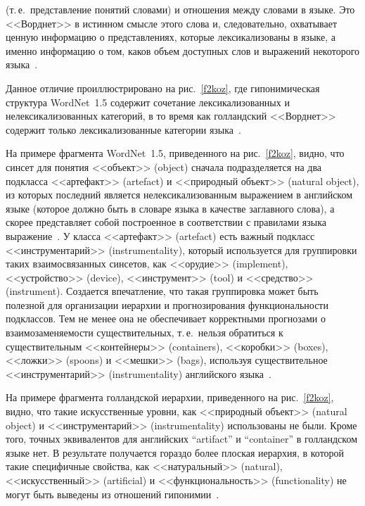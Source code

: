 \begin{multicols}{2}

\noindent
 (т.\,е.\ 
представление понятий словами) и отношения между словами в языке. Это 
<<Ворднет>> в истинном смысле этого слова и, следовательно, охватывает 
ценную информацию о представлениях, которые лексикализованы в языке, а 
именно информацию о том, каков объем доступных слов и выражений 
некоторого языка~\cite{4koz}. 

    
     Данное отличие проиллюстрировано на рис.~\ref{f2koz}, где 
гипонимическая структура WordNet~1.5 содержит сочетание 
лексикализованных и нелексикализованных категорий, в то время как 
голландский <<Ворднет>> содержит только лексикализованные категории 
языка~\cite{1koz, 4koz, 11koz}. 
     
     
     На примере фрагмента WordNet~1.5, приведенного на рис.~\ref{f2koz}, 
видно, что синсет для понятия <<объект>> (object) сначала подразделяется на 
два подкласса <<артефакт>> (artefact) и <<природный объект>> %
 (natu\-ral object), 
из которых последний является нелексикализованным выражением в 
английском языке (которое должно быть в словаре языка в качестве заглавного 
слова), а скорее представляет собой построенное в соответствии с правилами 
языка выражение~\cite{4koz}. У класса <<артефакт>> (artefact) есть важный 
подкласс <<инструментарий>> (instrumentality), который используется для 
группировки таких взаимосвязанных синсетов, как <<орудие>> (implement), 
<<устройство>> (device), <<инструмент>> (tool) и <<средство>> (instrument). 
Создается впечатление, что такая группировка может быть полезной для 
организации иерархии и прогнозирования функциональности подклассов. Тем 
не менее она не обеспечивает корректными прогнозами о вза\-и\-мо\-за\-ме\-ня\-емости 
существительных, т.\,е.\ нель\-зя обратиться к существительным 
<<контейнеры>> (containers), <<коробки>> (boxes), <<ложки>> (spoons) и 
<<мешки>> (bags), используя существительное <<инструментарий>> 
(instrumentality) английского языка~\cite{1koz, 4koz}. 
{

}

     
     На примере фрагмента голландской иерархии, приведенного на 
рис.~\ref{f2koz}, видно, что такие искусственные уровни, как <<природный 
объект>> (natural object) и <<инструментарий>> (instrumentality) использованы 
не были. Кроме того, точных эквивалентов для английских ``artifact''  и 
``container'' в голландском языке нет. В результате получается гораздо более 
плоская иерархия, в которой такие специфичные свойства, как 
<<натуральный>> (natural), <<искусственный>> (artificial) и 
<<функциональность>> (functionality) не могут быть выведены из отношений 
гипонимии~\cite{1koz, 4koz}. 
     

\end{multicols}
